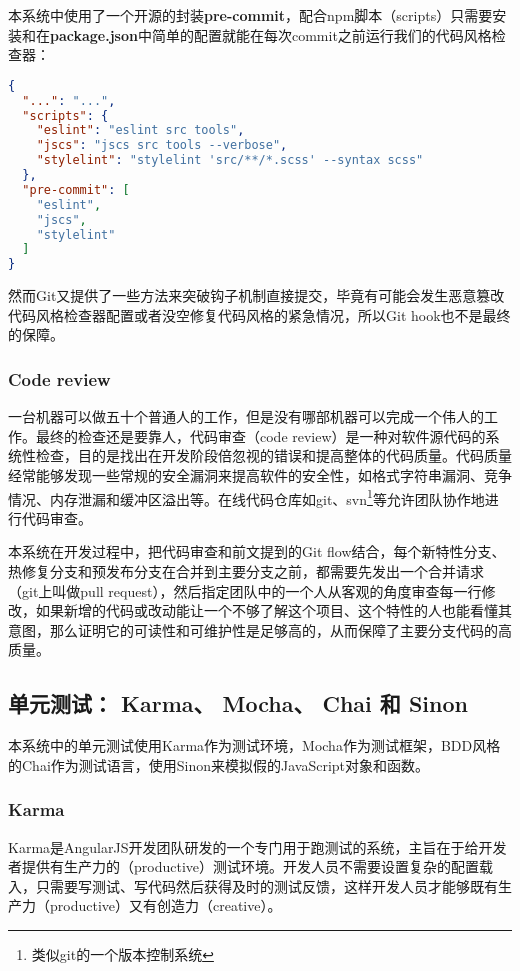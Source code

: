 本系统中使用了一个开源的封装\textbf{pre-commit}，配合npm脚本（scripts）只需要安装和在\textbf{package.json}中简单的配置就能在每次commit之前运行我们的代码风格检查器：
\begin{lstlisting}[language={json}, caption={package.json中的pre-commit设置部分}]
{
  "...": "...",
  "scripts": {
    "eslint": "eslint src tools",
    "jscs": "jscs src tools --verbose",
    "stylelint": "stylelint 'src/**/*.scss' --syntax scss"
  },
  "pre-commit": [
    "eslint",
    "jscs",
    "stylelint"
  ]
}
\end{lstlisting}

然而Git又提供了一些方法来突破钩子机制直接提交，毕竟有可能会发生恶意篡改代码风格检查器配置或者没空修复代码风格的紧急情况，所以Git hook也不是最终的保障。
\subsubsection{Code review}
一台机器可以做五十个普通人的工作，但是没有哪部机器可以完成一个伟人的工作\supercite{hubbard2015one}。最终的检查还是要靠人，代码审查（code review）是一种对软件源代码的系统性检查，目的是找出在开发阶段倍忽视的错误和提高整体的代码质量。代码质量经常能够发现一些常规的安全漏洞来提高软件的安全性，如格式字符串漏洞、竞争情况、内存泄漏和缓冲区溢出等。在线代码仓库如git、svn\footnote{类似git的一个版本控制系统}等允许团队协作地进行代码审查。

本系统在开发过程中，把代码审查和前文提到的Git flow结合，每个新特性分支、热修复分支和预发布分支在合并到主要分支之前，都需要先发出一个合并请求（git上叫做pull request），然后指定团队中的一个人从客观的角度审查每一行修改，如果新增的代码或改动能让一个不够了解这个项目、这个特性的人也能看懂其意图，那么证明它的可读性和可维护性是足够高的，从而保障了主要分支代码的高质量。
\subsection{单元测试： Karma、 Mocha、 Chai 和 Sinon}
本系统中的单元测试使用Karma作为测试环境，Mocha作为测试框架，BDD风格的Chai作为测试语言，使用Sinon来模拟假的JavaScript对象和函数。
\subsubsection{Karma}
Karma是AngularJS开发团队研发的一个专门用于跑测试的系统，主旨在于给开发者提供有生产力的（productive）测试环境。开发人员不需要设置复杂的配置载入，只需要写测试、写代码然后获得及时的测试反馈，这样开发人员才能够既有生产力（productive）又有创造力（creative）。

